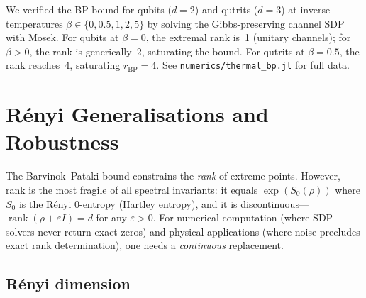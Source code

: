 \documentclass[11pt,a4paper]{article}
\theoremstyle{definition}
\begin{document}
We verified the BP bound for qubits ($d = 2$) and qutrits ($d = 3$)
at inverse temperatures $\beta \in \{0, 0.5, 1, 2, 5\}$ by solving
the Gibbs-preserving channel SDP with Mosek.  For qubits at $\beta = 0$,
the extremal rank is~1 (unitary channels); for $\beta > 0$, the
rank is generically~2, saturating the bound.  For qutrits at
$\beta = 0.5$, the rank reaches~4, saturating $r_{\mathrm{BP}} = 4$.
See \texttt{numerics/thermal\_bp.jl} for full data.

\section{R\'enyi Generalisations and Robustness}
\label{sec:renyi}

The Barvinok--Pataki bound constrains the \emph{rank} of extreme points.
However, rank is the most fragile of all spectral invariants: it equals
$\exp(S_0(\rho))$ where $S_0$ is the R\'enyi $0$-entropy (Hartley entropy),
and it is discontinuous---$\operatorname{rank}(\rho + \varepsilon I) = d$
for any $\varepsilon > 0$.  For numerical computation (where SDP solvers
never return exact zeros) and physical applications (where noise precludes
exact rank determination), one needs a \emph{continuous} replacement.

\subsection{R\'enyi dimension}
\end{document}
